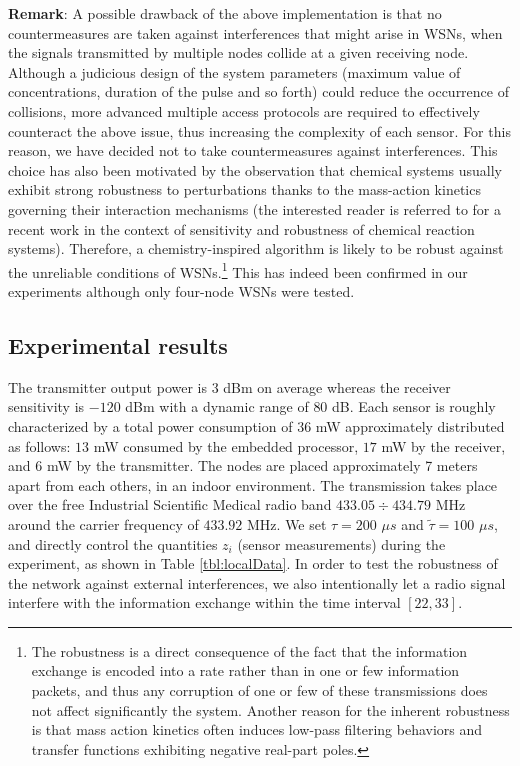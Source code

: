 \documentclass[journal]{IEEEtran}
\begin{document}
{{\bf{Remark}}: A possible drawback of the above implementation is that no countermeasures are taken against interferences that might arise in WSNs, when the signals transmitted by multiple nodes collide at a given receiving node. Although a judicious design of the system parameters (maximum value of concentrations, duration of the pulse and so forth) could reduce the occurrence of collisions, more advanced multiple access protocols are required to effectively counteract the above issue, thus increasing the complexity of each sensor. For this reason, we have decided not to take countermeasures against interferences. {This choice has also been motivated by the observation that chemical systems usually exhibit strong robustness to perturbations thanks to the mass-action kinetics governing their interaction mechanisms (the interested reader is referred to \cite{ShAl09} for a recent work in the context of sensitivity and robustness of chemical reaction systems). Therefore, a chemistry-inspired algorithm is likely to be robust against the unreliable conditions of WSNs.\footnote{{The robustness is a direct consequence of the fact that the information exchange is encoded into a rate rather than in one or few information packets, and thus any corruption of one or few of these transmissions does not affect significantly the system. Another reason for the inherent robustness is that mass action kinetics often induces low-pass filtering behaviors and transfer functions exhibiting negative real-part poles.}} {This has indeed been confirmed in our experiments although only four-node WSNs were tested}.}




\subsection{Experimental results}

The transmitter output power is $3$ dBm on average whereas the receiver sensitivity is $-120$ dBm with a dynamic range of $80$ dB. {Each sensor is roughly characterized by a total power consumption of $36$ mW approximately distributed as follows: $13$ mW consumed by the embedded processor, $17$ mW by the receiver, and $6$ mW by the transmitter. The nodes are placed approximately 7 meters apart from each others, in an indoor environment.}
The transmission takes place over the free Industrial Scientific Medical radio band $433.05 \div 434.79$ MHz around the carrier frequency of $433.92$ MHz. We set $\tau=200$ $\mu s$ and $\tilde \tau=100$ $\mu s$, and directly control the quantities $z_i$ (sensor measurements) during the experiment, as shown in Table \ref{tbl:localData}. 
In order to test the robustness of the network against external interferences, we also intentionally let a radio signal interfere with the information exchange within the time interval $[22, 33]$.

}
\end{document}
